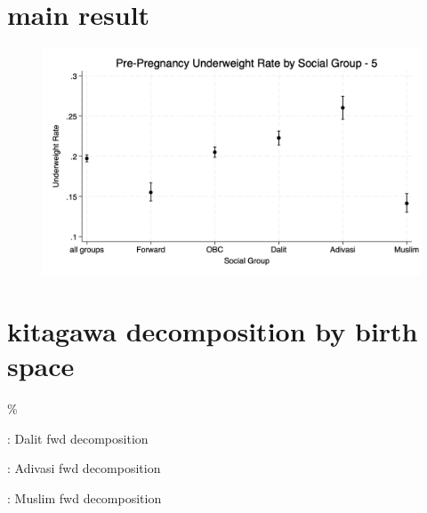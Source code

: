 \documentclass{article}
\begin{document}
\maketitle

\section{main result}

\begin{figure}[H]
    \centering
    \includegraphics[width=\textwidth]{figures/bootstrapped_underweight_by_group_5.png}
\end{figure}



\section{kitagawa decomposition by birth space}


\%

\begin{table}[H]
    \centering
    \footnotesize %
    \caption{: Dalit fwd decomposition}
    \label{tab:sumstat}
\end{table}

\begin{table}[H]
    \centering
    \footnotesize %
    \caption{: Adivasi fwd decomposition}
    \label{tab:sumstat}
\end{table}


\begin{table}[H]
    \centering
    \footnotesize %
    \caption{: Muslim fwd decomposition}
    \label{tab:sumstat}
\end{table}
\end{document}
